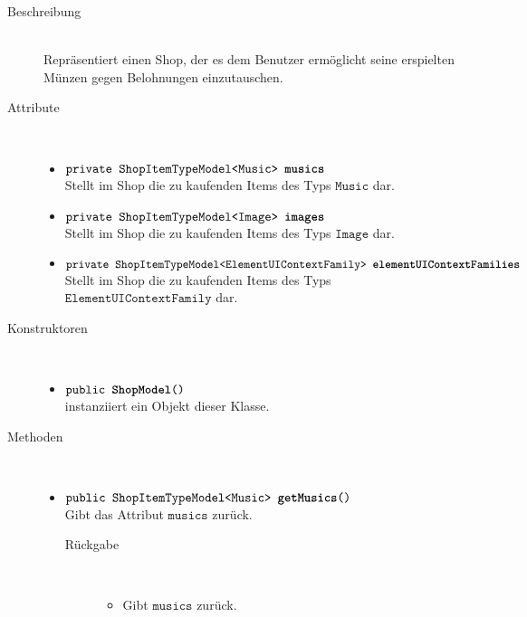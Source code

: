 \begin{description}
\item[Beschreibung] \hfill \\ Repräsentiert einen Shop, der es dem Benutzer ermöglicht seine erspielten Münzen gegen Belohnungen einzutauschen.

\item[Attribute] \hfill \\
	\vspace{-.8cm}
	\begin{itemize}
		\item $\texttt{private ShopItemTypeModel<Music> \textbf{musics}}$ \\ Stellt im Shop die zu kaufenden Items des Typs $\texttt{Music}$ dar.
		\item $\texttt{private ShopItemTypeModel<Image> \textbf{images}}$ \\ Stellt im Shop die zu kaufenden Items des Typs $\texttt{Image}$ dar.		
		\item $\texttt{private ShopItemTypeModel<ElementUIContextFamily> \textbf{elementUIContextFamilies}}$ \\ Stellt im Shop die zu kaufenden Items des Typs $\texttt{ElementUIContextFamily}$ dar.
		\end{itemize}
	
\item[Konstruktoren] \hfill \\
	\vspace{-.8cm}
	\begin{itemize}
		\item $\texttt{public \textbf{ShopModel}()}$ \\ instanziiert ein Objekt dieser Klasse.

	\end{itemize}
	
\item[Methoden] \hfill \\
	\vspace{-.8cm}
	\begin{itemize}
		\item $\texttt{public ShopItemTypeModel<Music> \textbf{getMusics}()}$ \\ Gibt das Attribut $\texttt{musics}$ zurück.
		\begin{description}
			\item[Rückgabe] \hfill \\
			\vspace{-.8cm}
			\begin{itemize}
				\item Gibt $\texttt{musics}$ zurück.
			\end{itemize}
			\end{description}
		

\end{itemize}
\end{description}
